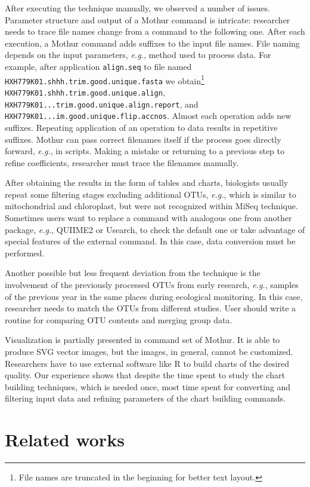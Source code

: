 \documentclass[a4paper]{jpconf}
\begin{document}
After executing the technique manually, we observed a number of issues. Parameter structure and output of a Mothur command is intricate: researcher needs to trace file names change from a command to the following one.  After each execution, a Mothur command adds suffixes to the input file names.  File naming depends on the input parameters, \emph{e.g.}, method used to process data. For example, after application \verb|align.seq| to file named \verb|HXH779K01.shhh.trim.good.unique.fasta| we obtain\footnote{File names are truncated in the beginning for better text layout.} \verb|HXH779K01.shhh.trim.good.unique.align|, \verb|HXH779K01...trim.good.unique.align.report|, and \verb|HXH779K01...im.good.unique.flip.accnos|.  Almost each operation adds new suffixes.  Repeating application of an operation to data results in repetitive suffixes.  Mothur can pass correct filenames itself if the process goes directly forward, \emph{e.g.}, in scripts.  Making a mistake or returning to a previous step to refine coefficients, researcher must trace the filenames manually.

After obtaining the results in the form of tables and charts, biologists usually repeat some filtering stages excluding additional OTUs, \emph{e.g.}, which is similar to mitochondrial and chloroplast, but were not recognized within MiSeq technique.
Sometimes users want to replace a command with analogous one from another package, \emph{e.g.}, QUIIME2 or Usearch, to check the default one or take advantage of special features of the external command. In this case, data conversion must be performed.

Another possible but less frequent deviation from the technique is the involvement of the previously processed OTUs from early research, \emph{e.g.}, samples of the previous year in the same places during ecological monitoring. In this case, researcher needs to match the OTUs from different studies. User should write a routine for comparing OTU contents and merging group data.

Visualization is partially presented in command set of Mothur.  It is able to produce SVG vector images, but the images, in general, cannot be customized.  Researchers have to use external software like R to build charts of the desired quality.  Our experience shows that despite the time spent to study the chart building techniques, which is needed once, most time spent for converting and filtering input data and refining parameters of the chart building commands.

\section{Related works}
\label{sec:relworks}
\end{document}
